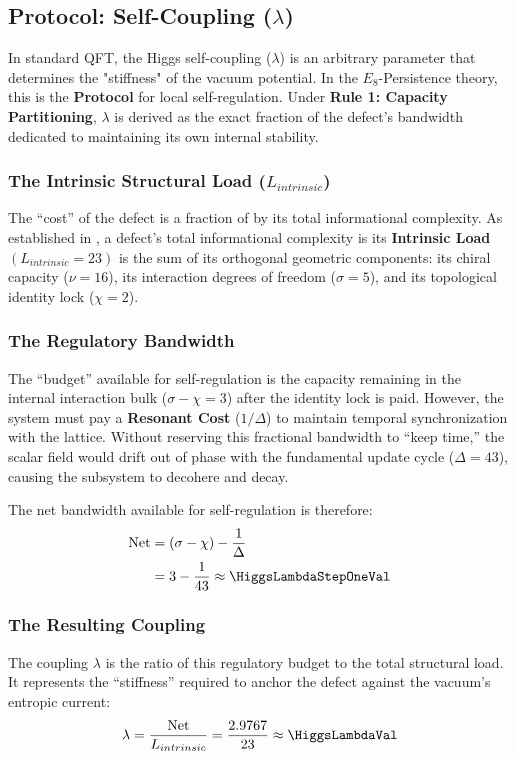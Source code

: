 \subsection{Protocol: Self-Coupling (\texorpdfstring{$\lambda$}{lambda})}
In standard QFT, the Higgs self-coupling ($\lambda$) is an arbitrary parameter that determines the "stiffness" of the vacuum potential. In the $E_8$-Persistence theory, this is the \textbf{Protocol} for local self-regulation. Under \textbf{Rule 1: Capacity Partitioning}, $\lambda$ is derived as the exact fraction of the defect's bandwidth dedicated to maintaining its own internal stability.

\subsubsection{The Intrinsic Structural Load (\texorpdfstring{$L_{intrinsic}$}{Lintrinsic})}
The ``cost'' of the defect is a fraction of by its total informational complexity. As established in \cite{meyer_informational_2026}, a defect's total informational complexity is its \textbf{Intrinsic Load} $(L_{intrinsic} = 23)$ is the sum of its orthogonal geometric components: its chiral capacity ($\nu=16$), its interaction degrees of freedom ($\sigma=5$), and its topological identity lock ($\chi=2$).

\subsubsection{The Regulatory Bandwidth}
The ``budget'' available for self-regulation is the capacity remaining in the internal interaction bulk ($\sigma - \chi = 3$) after the identity lock is paid. However, the system must pay a \textbf{Resonant Cost} ($1/\Delta$) to maintain temporal synchronization with the lattice. Without reserving this fractional bandwidth to ``keep time,'' the scalar field would drift out of phase with the fundamental update cycle ($\Delta=43$), causing the subsystem to decohere and decay.

The net bandwidth available for self-regulation is therefore:
\begin{equation}
\begin{split}    
\text{Net} &= (\sigma - \chi) - \frac{1}{\Delta} \\
&= 3 - \frac{1}{43} \approx \HiggsLambdaStepOneVal
\end{split}
\end{equation}

\subsubsection{The Resulting Coupling}
The coupling $\lambda$ is the ratio of this regulatory budget to the total structural load. It represents the ``stiffness'' required to anchor the defect against the vacuum's entropic current:
\begin{equation}
\lambda = \frac{\text{Net}}{L_{intrinsic}} = \frac{2.9767}{23} \approx \mathbf{\HiggsLambdaVal}
\end{equation}

